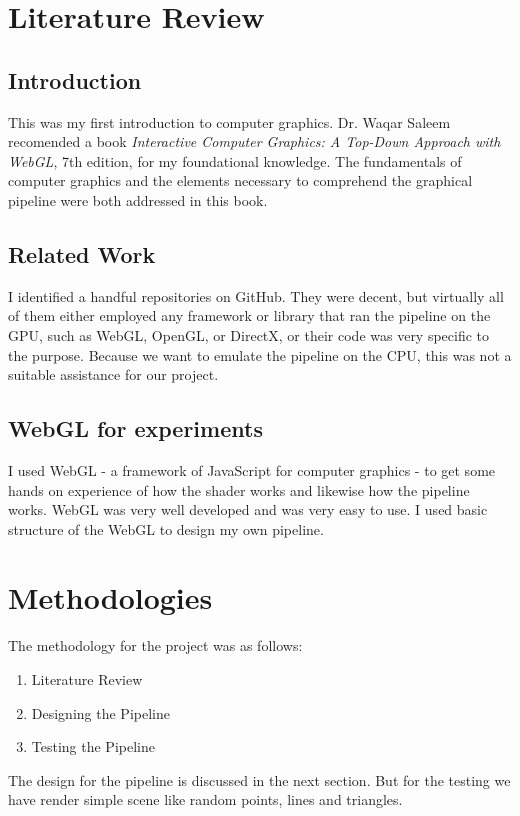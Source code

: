 \documentclass[a4paper]{article}
\theoremstyle{mytheoremstyle}
\theoremstyle{mytheoremstyle}
\theoremstyle{myproblemstyle}
\begin{document}
\section{Literature Review}

\subsection{Introduction}
This was my first introduction to computer graphics. Dr. Waqar Saleem recomended a book \emph{Interactive Computer Graphics: A Top-Down Approach with WebGL}\cite{book}, 7th edition, for my foundational knowledge. The fundamentals of computer graphics and the elements necessary to comprehend the graphical pipeline were both addressed in this book.

\subsection{Related Work}
I identified a handful repositories on GitHub. They were decent, but virtually all of them either employed any framework or library that ran the pipeline on the GPU, such as WebGL, OpenGL, or DirectX, or their code was very specific to the purpose. Because we want to emulate the pipeline on the CPU, this was not a suitable assistance for our project.

\subsection{WebGL for experiments}
I used WebGL - a framework of JavaScript for computer graphics - to get some hands on experience of how the shader works and likewise how the pipeline works. WebGL was very well developed and was very easy to use. I used basic structure of the WebGL to design my own pipeline.

\newpage

\section{Methodologies}
The methodology for the project was as follows:

\begin{enumerate}
    \item Literature Review
    \item Designing the Pipeline
    \item Testing the Pipeline
\end{enumerate}

The design for the pipeline is discussed in the next section. But for the testing we have render simple scene like random points, lines and triangles.
\end{document}

